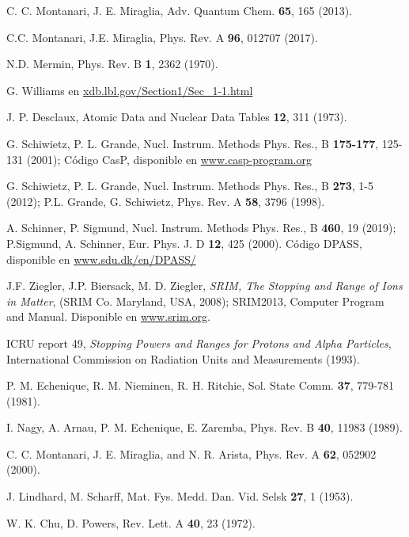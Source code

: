 \begin{thebibliography}{9}
C. C. Montanari, J. E. Miraglia,
Adv. Quantum Chem. \textbf{65}, 165 (2013).

C.C. Montanari, J.E. Miraglia, 
Phys. Rev. A \textbf{96}, 012707 (2017).

N.D. Mermin, 
Phys. Rev. B \textbf{1}, 2362 (1970).

G. Williams en 
\href{http://xdb.lbl.gov/Section1/Sec\_1-1.html}{xdb.lbl.gov/Section1/Sec\_1-1.html}

J. P. Desclaux,
Atomic Data and Nuclear Data Tables \textbf{12}, 311 (1973).

G. Schiwietz, P. L. Grande, 
Nucl. Instrum. Methods Phys. Res., B \textbf{175-177}, 125-131 (2001); 
Código CasP, disponible en \href{https://www.casp-program.org}{www.casp-program.org}

G. Schiwietz, P. L. Grande,
Nucl. Instrum. Methods Phys. Res., B \textbf{273}, 1-5 (2012); 
P.L. Grande, G. Schiwietz, 
Phys. Rev. A \textbf{58}, 3796 (1998).

A. Schinner, P. Sigmund, 
Nucl. Instrum. Methods Phys. Res., B \textbf{460}, 19 (2019); 
P.Sigmund, A. Schinner, 
Eur. Phys. J. D \textbf{12}, 425 (2000). 
Código DPASS, disponible en \href{https://www.sdu.dk/en/DPASS/}{www.sdu.dk/en/DPASS/}

J.F. Ziegler, J.P. Biersack, M. D. Ziegler, 
\textit{SRIM, The Stopping and Range of Ions in Matter}, 
(SRIM Co. Maryland, USA, 2008); 
SRIM2013, Computer Program and Manual. Disponible en \href{https://www.srim.org}{www.srim.org}.

ICRU report 49, \textit{Stopping Powers and Ranges for Protons and Alpha Particles},
International Commission on Radiation Units and Measurements (1993).

P. M. Echenique, R. M. Nieminen, R. H. Ritchie, 
Sol. State Comm. \textbf{37}, 779-781 (1981).

I. Nagy, A. Arnau, P. M. Echenique, E. Zaremba, 
Phys. Rev. B \textbf{40}, 11983 (1989).

C. C. Montanari, J. E. Miraglia, and N. R. Arista, 
Phys. Rev. A \textbf{62}, 052902 (2000).

J. Lindhard, M. Scharff,  
Mat. Fys. Medd. Dan. Vid. Selsk  \textbf{27}, 1 (1953).

W. K. Chu, D. Powers, 
Rev. Lett. A \textbf{40}, 23 (1972).


\end{thebibliography}
